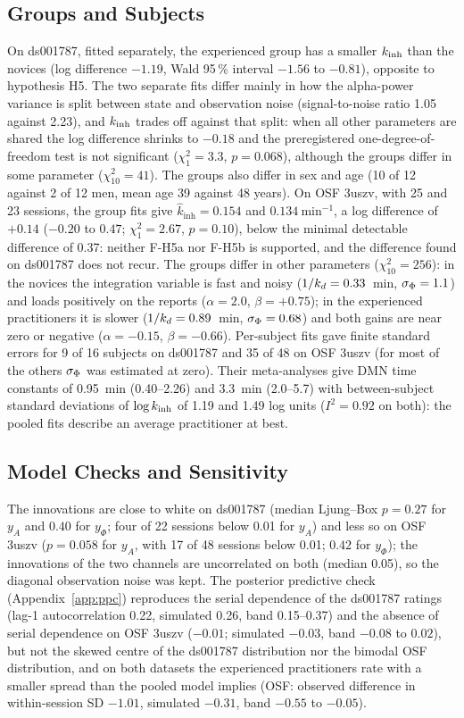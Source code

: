 \subsection{Groups and Subjects}
On ds001787, fitted separately, the experienced group has a smaller $k_{\mathrm{inh}}$ than the novices (log difference $-1.19$, Wald 95\,\% interval $-1.56$ to $-0.81$), opposite to hypothesis H5. The two separate fits differ mainly in how the alpha-power variance is split between state and observation noise (signal-to-noise ratio 1.05 against 2.23), and $k_{\mathrm{inh}}$ trades off against that split: when all other parameters are shared the log difference shrinks to $-0.18$ and the preregistered one-degree-of-freedom test is not significant ($\chi^2_1=3.3$, $p=0.068$), although the groups differ in some parameter ($\chi^2_{10}=41$). The groups also differ in sex and age (10 of 12 against 2 of 12 men, mean age 39 against 48 years). On OSF 3uszv, with 25 and 23 sessions, the group fits give $\hat k_{\mathrm{inh}}=0.154$ and $0.134~\mathrm{min^{-1}}$, a log difference of $+0.14$ ($-0.20$ to $0.47$; $\chi^2_1=2.67$, $p=0.10$), below the minimal detectable difference of 0.37: neither F-H5a nor F-H5b is supported, and the difference found on ds001787 does not recur. The groups differ in other parameters ($\chi^2_{10}=256$): in the novices the integration variable is fast and noisy ($1/k_{d}=0.33$~min, $\sigma_{\Phi}=1.1$) and loads positively on the reports ($\alpha=2.0$, $\beta=+0.75$); in the experienced practitioners it is slower ($1/k_{d}=0.89$~min, $\sigma_{\Phi}=0.68$) and both gains are near zero or negative ($\alpha=-0.15$, $\beta=-0.66$). Per-subject fits gave finite standard errors for 9 of 16 subjects on ds001787 and 35 of 48 on OSF 3uszv (for most of the others $\sigma_{\Phi}$ was estimated at zero). Their meta-analyses give DMN time constants of 0.95~min (0.40--2.26) and 3.3~min (2.0--5.7) with between-subject standard deviations of $\log k_{\mathrm{inh}}$ of 1.19 and 1.49 log units ($I^2=0.92$ on both): the pooled fits describe an average practitioner at best.

\subsection{Model Checks and Sensitivity}
The innovations are close to white on ds001787 (median Ljung--Box $p=0.27$ for $y_A$ and $0.40$ for $y_\Phi$; four of 22 sessions below 0.01 for $y_A$) and less so on OSF 3uszv ($p=0.058$ for $y_A$, with 17 of 48 sessions below 0.01; $0.42$ for $y_\Phi$); the innovations of the two channels are uncorrelated on both (median 0.05), so the diagonal observation noise was kept. The posterior predictive check (Appendix~\ref{app:ppc}) reproduces the serial dependence of the ds001787 ratings (lag-1 autocorrelation 0.22, simulated 0.26, band 0.15--0.37) and the absence of serial dependence on OSF 3uszv ($-0.01$; simulated $-0.03$, band $-0.08$ to $0.02$), but not the skewed centre of the ds001787 distribution nor the bimodal OSF distribution, and on both datasets the experienced practitioners rate with a smaller spread than the pooled model implies (OSF: observed difference in within-session SD $-1.01$, simulated $-0.31$, band $-0.55$ to $-0.05$).

